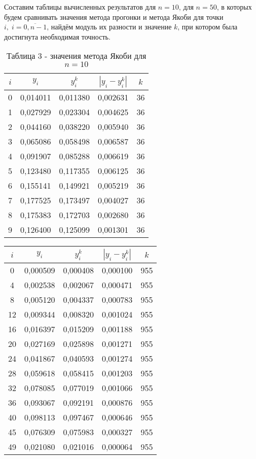 \documentclass[a4paper,12pt]{article}
\begin{document}
{Составим таблицы вычисленных результатов для $n = 10$, для $n = 50$, 
в которых будем сравнивать значения метода прогонки и метода Якоби для точки $i,\; i = \overline{0, n - 1}$, 
найдём модуль их разности и значение $k$, при котором была достигнута необходимая точность.
\begin{table}[h]
    \centering
    \begin{tabular}{|c|c|c|c|c|}
        \hline
        $i$ & $y_i$ & $y_i^k$ & $\left|y_i - y_i^k\right|$ & $k$\\
        \hline
		0 &  0,014011 &  0,011380 &  0,002631 & 36 \\ \hline
		1 &  0,027929 &  0,023304 &  0,004625 & 36 \\ \hline
		2 &  0,044160 &  0,038220 &  0,005940 & 36 \\ \hline
		3 &  0,065086 &  0,058498 &  0,006587 & 36 \\ \hline
		4 &  0,091907 &  0,085288 &  0,006619 & 36 \\ \hline
		5 &  0,123480 &  0,117355 &  0,006125 & 36 \\ \hline
		6 &  0,155141 &  0,149921 &  0,005219 & 36 \\ \hline
		7 &  0,177525 &  0,173497 &  0,004027 & 36 \\ \hline
		8 &  0,175383 &  0,172703 &  0,002680 & 36 \\ \hline
		9 &  0,126400 &  0,125099 &  0,001301 & 36 \\ \hline
    \end{tabular}
    \caption*{\small{Таблица 3 - значения метода Якоби для $n = 10$}}
\end{table}
\begin{table}[h]
    \centering
    \begin{tabular}{|c|c|c|c|c|}
        \hline
        $i$ & $y_i$ & $y_i^k$ & $\left|y_i - y_i^k\right|$ & $k$\\
        \hline
	    0 & 0,000509 & 0,000408 & 0,000100 & 955 \\ \hline
	    4 & 0,002538 & 0,002067 & 0,000471 & 955 \\ \hline
	    8 & 0,005120 & 0,004337 & 0,000783 & 955 \\ \hline
	   12 & 0,009344 & 0,008320 & 0,001024 & 955 \\ \hline
	   16 & 0,016397 & 0,015209 & 0,001188 & 955 \\ \hline
	   20 & 0,027169 & 0,025898 & 0,001271 & 955 \\ \hline
	   24 & 0,041867 & 0,040593 & 0,001274 & 955 \\ \hline
	   28 & 0,059618 & 0,058415 & 0,001203 & 955 \\ \hline
	   32 & 0,078085 & 0,077019 & 0,001066 & 955 \\ \hline
	   36 & 0,093067 & 0,092191 & 0,000876 & 955 \\ \hline
	   40 & 0,098113 & 0,097467 & 0,000646 & 955 \\ \hline
	   45 & 0,076309 & 0,075983 & 0,000327 & 955 \\ \hline
	   49 & 0,021080 & 0,021016 & 0,000064 & 955 \\ \hline
	   

\end{tabular}
\end{table}}
\end{document}
